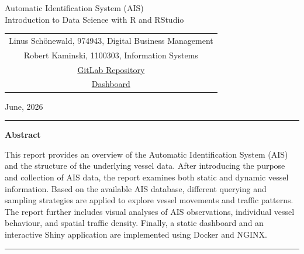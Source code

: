 \documentclass[10pt,a4paper]{article}
\begin{document}
\thispagestyle{empty}

\vspace*{1.0cm}

\begin{center}
    {\Large Automatic Identification System (AIS)}\\[0.1cm]
    {\normalsize Introduction to Data Science with R and RStudio}

    \vspace{0.8cm}

    \begin{tabular}{c}
        \small Linus Schönewald, 974943, Digital Business Management\\
        \vspace{0.2cm}
        \small Robert Kaminski, 1100303, Information Systems\\
        \small \href{https://aidaho-edu.uni-hohenheim.de/gitlab/b0bat/aidaho_ids_thas_2026}{GitLab Repository}\\
        \small \href{http://193.197.231.174:7080/}{Dashboard}
    \end{tabular}

    \vspace{0.5cm}

    \small June, 2026
\end{center}

\vspace{0.5cm}

\hrule

\vspace{0.4cm}

\noindent\textbf{Abstract}

\vspace{0.2cm}

This report provides an overview of the Automatic Identification System (AIS) and the structure of the underlying vessel data.
After introducing the purpose and collection of AIS data, the report examines both static and dynamic vessel information.
Based on the available AIS database, different querying and sampling strategies are applied to explore vessel movements and traffic patterns.
The report further includes visual analyses of AIS observations, individual vessel behaviour, and spatial traffic density.
Finally, a static dashboard and an interactive Shiny application are implemented using Docker and NGINX.

\vspace{0.4cm}

\hrule
\end{document}
